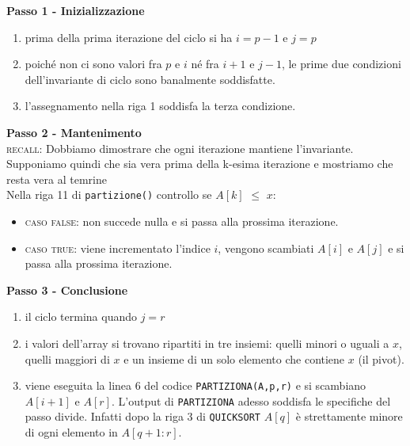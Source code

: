 \noindent \textbf{Passo 1 - Inizializzazione}
\begin{enumerate}
    \item prima della prima iterazione del ciclo si ha $i = p-1$ e $j = p$ 
    \item poiché non ci sono valori fra $p$ e $i$ né fra $i+1$ e $j-1$, le prime due condizioni dell'invariante di ciclo sono banalmente soddisfatte.
    \item l'assegnamento nella riga 1 soddisfa la terza condizione.
\end{enumerate}
\noindent \textbf{Passo 2 - Mantenimento}\\
\textsc{recall}: Dobbiamo dimostrare che ogni iterazione mantiene l'invariante. Supponiamo quindi che sia vera prima della k-esima iterazione e mostriamo che resta vera al temrine\smallskip\\
Nella riga 11 di \texttt{partizione()} controllo se $A[k]$ $\le$ $x$:
    \begin{itemize}
        \item \textsc{caso false}: non succede nulla e si passa alla prossima iterazione.
        \item \textsc{caso true}: viene incrementato l'indice $i$, vengono scambiati $A[i]$ e $A[j]$ e si passa alla prossima iterazione. 
    \end{itemize}


\noindent \textbf{Passo 3 - Conclusione}
\begin{enumerate}
    \item il ciclo termina quando $j=r$
    \item i valori dell'array si trovano ripartiti in tre insiemi: quelli minori o uguali a $x$, quelli maggiori di $x$ e un insieme di un solo elemento che contiene $x$ (il pivot).
    \item viene eseguita la linea 6 del codice \texttt{PARTIZIONA(A,p,r)} e si scambiano $A[i+1]$ e $A[r]$. L'output di \texttt{PARTIZIONA} adesso soddisfa le specifiche del passo divide. Infatti dopo la riga 3 di \texttt{QUICKSORT} $A[q]$ è strettamente minore di ogni elemento in $A[q+1 : r]$. 
\end{enumerate}
